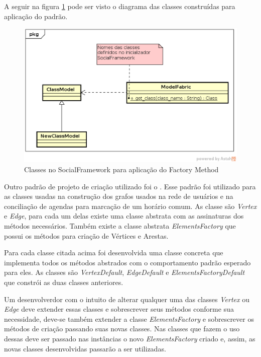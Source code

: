A seguir na figura \ref{padrao_factory_method} pode ser visto o diagrama das classes construídas para aplicação do padrão.

\newpage
\begin{figure}[h]
    \centering
    \includegraphics[scale=0.6]{figuras/social_framework/factory_method.eps}
    \caption{Classes no SocialFramework para aplicação do Factory Method}
    \label{padrao_factory_method}
\end{figure}

Outro padrão de projeto de criação utilizado foi o . Esse padrão foi utilizado para as classes usadas na construção dos grafos usados na rede de usuários e na conciliação de agendas para marcação de um horário comum. As classe são \textit{Vertex} e \textit{Edge}, para cada um delas existe uma classe abstrata com as assinaturas dos métodos necessários. Também existe a classe abstrata \textit{ElementsFactory} que possui os métodos para criação de Vértices e Arestas.

Para cada classe citada acima foi desenvolvida uma classe concreta que implementa todos os métodos abstrados com o comportamento padrão esperado para eles. As classes são \textit{VertexDefault}, \textit{EdgeDefault} e \textit{ElementsFactoryDefault} que constrói as duas classes anteriores.

Um desenvolverdor com o intuito de alterar qualquer uma das classes \textit{Vertex} ou \textit{Edge} deve extender essas classes e sobrescrever seus métodos conforme sua necessidade, deve-se também extender a classe \textit{ElementsFactory} e sobrescrever os métodos de criação passando suas novas classes. Nas classes que fazem o uso dessas deve ser passado nas instâncias o novo \textit{ElementsFactory} criado e, assim, as novas classes desenvolvidas passarão a ser utilizadas.

